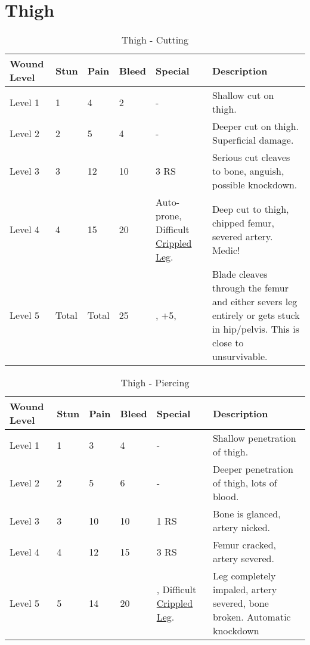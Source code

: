 \documentclass[oneside,11pt,english]{book}
\begin{document}
\section{Thigh} \vspace{-25pt} \label{sec:thigh}
\begin{table}[hb] %
	\caption{Thigh - Cutting}
	\label{wound:Thigh - Cutting}
	\begin{tabu} to 
Wound Level &Stun &Pain &Bleed &Special &Description\\\toprule
Level 1& 1& 4& 2& - &Shallow cut on thigh.\\
Level 2& 2& 5& 4& - &Deeper cut on thigh. Superficial damage.\\
Level 3& 3& 12& 10&  3 RS &Serious cut cleaves to bone, anguish, possible knockdown.\\
Level 4& 4& 15& 20
	&Auto-prone,\newline
		Difficult~ \hyperref[bane:Crippled Limb/Appendage]{Crippled Leg}.
&Deep cut to thigh, chipped femur, severed artery. Medic!\\
Level 5& Total& Total& 25 
	&,\newline
		 +5,\newline
	&Blade cleaves through the femur and either severs leg entirely or gets stuck in hip/pelvis. This is close to unsurvivable.\\
	\end{tabu}
\end{table}

\begin{table}[hb] %
	\caption{Thigh - Piercing}
	\label{wound:Thigh - Piercing}
	\begin{tabu} to 
Wound Level &Stun &Pain &Bleed &Special &Description\\\toprule
Level 1& 1& 3& 4& - &Shallow penetration of thigh.\\
Level 2& 2& 5& 6& - &Deeper penetration of thigh, lots of blood.\\
Level 3& 3& 10& 10&  1 RS &Bone is glanced, artery nicked.\\
Level 4& 4& 12& 15&  3 RS &Femur cracked, artery severed.\\
Level 5& 5& 14& 20
	&, \newline
		Difficult~ \hyperref[bane:Crippled Limb/Appendage]{Crippled Leg}.
	&Leg completely impaled, artery severed, bone broken. Automatic knockdown\\
	\end{tabu}
\end{table}
\end{document}
